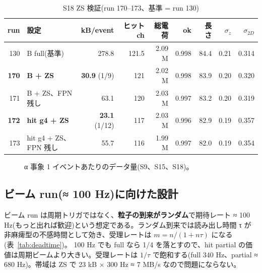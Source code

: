 \documentclass[a4paper,11pt]{ltjsarticle}
\begin{document}
\begin{table}[h]\centering\small
\caption{S18 ZS 検証(run 170--173、基準 = run 130)}
\label{tab:zs}
\footnotesize
\begin{tabular}{rlrrrrrrr}
\toprule
run & 設定 & kB/event & ヒット ch & 総電荷 & ok & 長さ & $\sigma_z$ & $\sigma_{2D}$ \\
\midrule
130 & B full(基準) & 278.8 & 121.5 & 2.09 M & 0.998 & 84.4 & 0.21 & 0.314 \\
\textbf{170} & \textbf{B + ZS} & \textbf{30.9} (1/9) & 121 & 2.02 M & 0.998 & 83.9 & 0.20 & 0.320 \\
171 & B + ZS、FPN 残し & 63.1 & 120 & 2.03 M & 0.997 & 83.2 & 0.20 & 0.319 \\
\textbf{172} & \textbf{hit g4 + ZS} & \textbf{23.1} (1/12) & 117 & 2.03 M & 0.996 & 82.9 & 0.19 & 0.357 \\
173 & hit g4 + ZS、FPN 残し & 55.7 & 116 & 1.99 M & 0.997 & 82.0 & 0.19 & 0.354 \\
\bottomrule
\end{tabular}
\end{table}

\begin{figure}[h]\centering
{}
\caption{α 事象 1 イベントあたりのデータ量(S9、S15、S18)。}
\end{figure}

\subsection{ビーム run(≈ 100 Hz)に向けた設計}
ビーム run は周期トリガではなく、\textbf{粒子の到来がランダム}で期待レート ≈ 100 Hz(もっと出れば歓迎)という想定である。ランダム到来では読み出し時間 τ が非麻痺型の不感時間として効き、受理レートは $m = n/(1 + n\tau)$ になる(表~\ref{tab:deadtime})。
100 Hz でも full なら 1/4 を落とすので、hit partial の価値は周期ビームより大きい。受理レートは $1/\tau$ で飽和する(full 340 Hz、partial ≈ 680 Hz)。帯域は ZS で 23 kB × 300 Hz ≈ 7 MB/s なので問題にならない。
\end{document}
